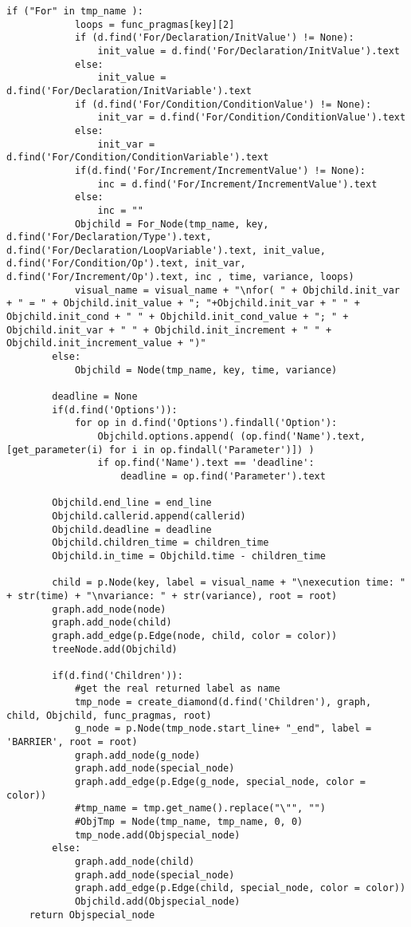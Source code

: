 \documentclass[a4paper,11pt,twoside]{book}
\begin{document}
\begin{lstlisting}[language=CCC, caption=pargraph.py]
		if ("For" in tmp_name ):
			loops = func_pragmas[key][2]
			if (d.find('For/Declaration/InitValue') != None):
				init_value = d.find('For/Declaration/InitValue').text
			else:
				init_value = d.find('For/Declaration/InitVariable').text
			if (d.find('For/Condition/ConditionValue') != None):
				init_var = d.find('For/Condition/ConditionValue').text
			else:
				init_var = d.find('For/Condition/ConditionVariable').text
			if(d.find('For/Increment/IncrementValue') != None):
				inc = d.find('For/Increment/IncrementValue').text
			else:
				inc = ""
			Objchild = For_Node(tmp_name, key, d.find('For/Declaration/Type').text, d.find('For/Declaration/LoopVariable').text, init_value, d.find('For/Condition/Op').text, init_var, d.find('For/Increment/Op').text, inc , time, variance, loops)
			visual_name = visual_name + "\nfor( " + Objchild.init_var + " = " + Objchild.init_value + "; "+Objchild.init_var + " " + Objchild.init_cond + " " + Objchild.init_cond_value + "; " + Objchild.init_var + " " + Objchild.init_increment + " " + Objchild.init_increment_value + ")"
		else:
			Objchild = Node(tmp_name, key, time, variance)

		deadline = None
		if(d.find('Options')):
			for op in d.find('Options').findall('Option'):
				Objchild.options.append( (op.find('Name').text,[get_parameter(i) for i in op.findall('Parameter')]) )
				if op.find('Name').text == 'deadline':
					deadline = op.find('Parameter').text

		Objchild.end_line = end_line
		Objchild.callerid.append(callerid)
		Objchild.deadline = deadline
		Objchild.children_time = children_time
		Objchild.in_time = Objchild.time - children_time

		child = p.Node(key, label = visual_name + "\nexecution time: " + str(time) + "\nvariance: " + str(variance), root = root)
		graph.add_node(node)
		graph.add_node(child)
		graph.add_edge(p.Edge(node, child, color = color))
		treeNode.add(Objchild)

		if(d.find('Children')):
			#get the real returned label as name
			tmp_node = create_diamond(d.find('Children'), graph, child, Objchild, func_pragmas, root)
			g_node = p.Node(tmp_node.start_line+ "_end", label = 'BARRIER', root = root)
			graph.add_node(g_node)
			graph.add_node(special_node)
			graph.add_edge(p.Edge(g_node, special_node, color = color))
			#tmp_name = tmp.get_name().replace("\"", "") 
			#ObjTmp = Node(tmp_name, tmp_name, 0, 0)
			tmp_node.add(Objspecial_node)
		else:
			graph.add_node(child)
			graph.add_node(special_node)
			graph.add_edge(p.Edge(child, special_node, color = color))
			Objchild.add(Objspecial_node)
	return Objspecial_node


\end{lstlisting}
\end{document}
